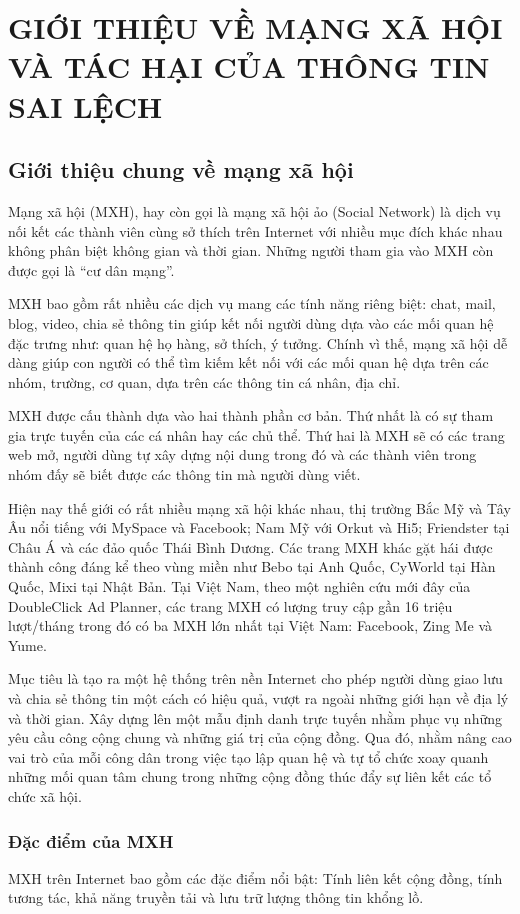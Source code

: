 \chapter{GIỚI THIỆU VỀ MẠNG XÃ HỘI VÀ TÁC HẠI CỦA THÔNG TIN SAI LỆCH }

\section{Giới thiệu chung về mạng xã hội}
Mạng xã hội (MXH), hay còn gọi là mạng xã hội ảo (Social Network) là dịch vụ nối kết các thành viên cùng sở thích trên Internet với nhiều mục đích khác nhau không phân biệt không gian và thời gian. Những người tham gia vào MXH còn được gọi là “cư dân mạng”. 

MXH bao gồm rất nhiều các dịch vụ mang các tính năng riêng biệt: chat, mail, blog, video, chia sẻ thông tin giúp kết nối người dùng dựa vào các mối quan hệ đặc trưng như: quan hệ họ hàng, sở thích, ý tưởng. Chính vì thế, mạng xã hội dễ dàng giúp con người có thể tìm kiếm kết nối với các mối quan hệ dựa trên các nhóm, trường, cơ quan, dựa trên các thông tin cá nhân, địa chỉ. 

MXH được cấu thành dựa vào hai thành phần cơ bản. Thứ nhất là có sự tham gia trực tuyến của các cá nhân hay các chủ thể. Thứ hai là MXH sẽ có các trang web mở, người dùng tự xây dựng nội dung trong đó và các thành viên trong nhóm đấy sẽ biết được các thông tin mà người dùng viết.

Hiện nay thế giới có rất nhiều mạng xã hội khác nhau, thị trường Bắc Mỹ và Tây Âu nổi tiếng với MySpace và Facebook; Nam Mỹ với Orkut và Hi5; Friendster tại Châu Á và các đảo quốc Thái Bình Dương. Các  trang MXH khác gặt hái được thành công đáng kể theo vùng miền như Bebo tại Anh Quốc, CyWorld tại Hàn Quốc, Mixi tại Nhật Bản. Tại Việt Nam, theo một nghiên cứu mới đây của DoubleClick Ad Planner, các trang MXH có lượng truy cập gần 16 triệu lượt/tháng trong đó có ba MXH lớn nhất tại Việt Nam: Facebook, Zing Me và Yume.

Mục tiêu là tạo ra một hệ thống trên nền Internet cho phép người dùng giao lưu và chia sẻ thông tin một cách có hiệu quả, vượt ra ngoài những giới hạn về địa lý và thời gian. Xây dựng lên một mẫu định danh trực tuyến nhằm phục vụ những yêu cầu công cộng chung và những giá trị của cộng đồng. Qua đó, nhằm nâng cao vai trò của mỗi công dân trong việc tạo lập quan hệ và tự tổ chức xoay quanh những mối quan tâm chung trong những cộng đồng thúc đẩy sự liên kết các tổ chức xã hội.
	\subsection{Đặc điểm của MXH}
	MXH trên Internet bao gồm các đặc điểm nổi bật: Tính liên kết cộng đồng, tính tương tác, khả năng truyền tải và lưu trữ lượng thông tin khổng lồ.

